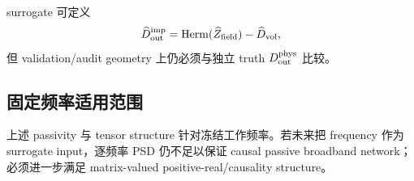 surrogate 可定义
\begin{equation}
\widehat D_{\rm out}^{\rm imp}
=\operatorname{Herm}(\widehat Z_{\rm field})-\widehat D_{\rm vol},
\end{equation}
但 validation/audit geometry 上仍必须与独立 truth $D_{\rm out}^{\rm phys}$ 比较。

\subsection{固定频率适用范围}
上述 passivity 与 tensor structure 针对冻结工作频率。若未来把 frequency 作为 surrogate input，逐频率 PSD 仍不足以保证 causal passive broadband network；必须进一步满足 matrix-valued positive-real/causality structure。
